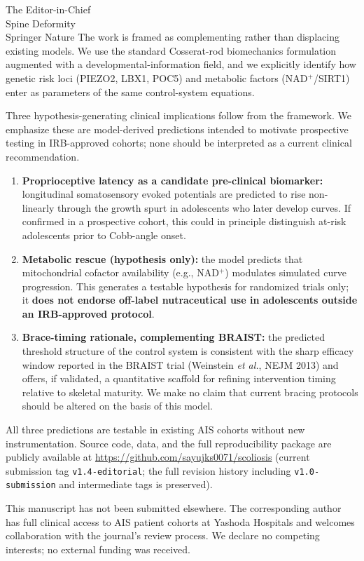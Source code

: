\documentclass[12pt]{letter}
\begin{document}
\begin{letter}{The Editor-in-Chief\\Spine Deformity\\Springer Nature}
The work is framed as complementing rather than displacing existing models. We use the standard Cosserat-rod biomechanics formulation augmented with a developmental-information field, and we explicitly identify how genetic risk loci (PIEZO2, LBX1, POC5) and metabolic factors (NAD$^+$/SIRT1) enter as parameters of the same control-system equations.

Three hypothesis-generating clinical implications follow from the framework. We emphasize these are model-derived predictions intended to motivate prospective testing in IRB-approved cohorts; none should be interpreted as a current clinical recommendation.

\begin{enumerate}
\item \textbf{Proprioceptive latency as a candidate pre-clinical biomarker:} longitudinal somatosensory evoked potentials are predicted to rise non-linearly through the growth spurt in adolescents who later develop curves. If confirmed in a prospective cohort, this could in principle distinguish at-risk adolescents prior to Cobb-angle onset.
\item \textbf{Metabolic rescue (hypothesis only):} the model predicts that mitochondrial cofactor availability (e.g., NAD$^+$) modulates simulated curve progression. This generates a testable hypothesis for randomized trials only; it \textbf{does not endorse off-label nutraceutical use in adolescents outside an IRB-approved protocol}.
\item \textbf{Brace-timing rationale, complementing BRAIST:} the predicted threshold structure of the control system is consistent with the sharp efficacy window reported in the BRAIST trial (Weinstein \emph{et al.}, NEJM 2013) and offers, if validated, a quantitative scaffold for refining intervention timing relative to skeletal maturity. We make no claim that current bracing protocols should be altered on the basis of this model.
\end{enumerate}

All three predictions are testable in existing AIS cohorts without new instrumentation. Source code, data, and the full reproducibility package are publicly available at \url{https://github.com/sayujks0071/scoliosis} (current submission tag \texttt{v1.4-editorial}; the full revision history including \texttt{v1.0-submission} and intermediate tags is preserved).

This manuscript has not been submitted elsewhere. The corresponding author has full clinical access to AIS patient cohorts at Yashoda Hospitals and welcomes collaboration with the journal's review process. We declare no competing interests; no external funding was received.


\end{letter}
\end{document}
